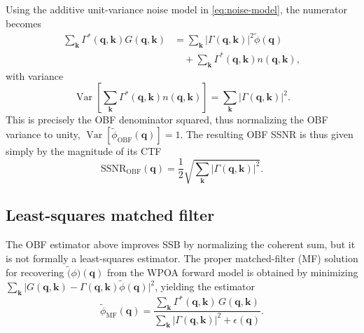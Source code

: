 \documentclass[pdflatex,sn-aps,iicol]{sn-jnl}%
\begin{document}
Using the additive unit-variance noise model in \cref{eq:noise-model}, the numerator becomes
\begin{align}
  \sum_{\boldsymbol{k}}\Gamma^{*}(\boldsymbol{q},\boldsymbol{k})G(\boldsymbol{q},\boldsymbol{k}) &=
  \sum_{\boldsymbol{k}}\lvert \Gamma(\boldsymbol{q},\boldsymbol{k}) \rvert^2 \tilde{\phi}(\boldsymbol{q}) \nonumber\\
  &\quad + \sum_{\boldsymbol{k}}\Gamma^{*}(\boldsymbol{q},\boldsymbol{k})n(\boldsymbol{q},\boldsymbol{k}),
  \label{eq:obf-numerator}
\end{align}
with variance
\begin{equation}
  \operatorname{Var}\!\left[ \sum_{\boldsymbol{k}}\Gamma^{*}(\boldsymbol{q},\boldsymbol{k})n(\boldsymbol{q},\boldsymbol{k}) \right] = \sum_{\boldsymbol{k}}\lvert \Gamma(\boldsymbol{q},\boldsymbol{k}) \rvert^2 .
  \label{eq:obf-var}
\end{equation}
This is precisely the OBF denominator squared, thus normalizing the OBF variance to unity, $\operatorname{Var}[\tilde{\phi}_{\text{OBF}}(\boldsymbol{q})]=1$.
The resulting OBF SSNR is thus given simply by the magnitude of its CTF
\begin{equation}
  \mathrm{SSNR}_{\text{OBF}}(\boldsymbol{q}) = \frac{1}{2} \sqrt{\sum_{\boldsymbol{k}}\lvert \Gamma(\boldsymbol{q},\boldsymbol{k}) \rvert^2}.
  \label{eq:obf-ssnr}
\end{equation}

\subsection*{Least-squares matched filter}
\label{sec:wdd}

The OBF estimator above improves SSB by normalizing the coherent sum, but it is not formally a least-squares estimator.
The proper matched-filter (MF) solution for recovering $\tilde(\phi)(\boldsymbol{q})$ from the WPOA forward model is obtained by minimizing $\sum_{\boldsymbol{k}}\lvert G(\boldsymbol{q},\boldsymbol{k})-\Gamma(\boldsymbol{q},\boldsymbol{k})\tilde{\phi}(\boldsymbol{q}) \rvert^2$, yielding the estimator
\begin{equation}
  \tilde{\phi}_{\text{MF}}(\boldsymbol{q}) = 
  \frac{\sum_{\boldsymbol{k}} \Gamma^{*}(\boldsymbol{q},\boldsymbol{k})\,G(\boldsymbol{q},\boldsymbol{k})}
  {\sum_{\boldsymbol{k}}\lvert \Gamma(\boldsymbol{q},\boldsymbol{k}) \rvert^2 + \epsilon(\boldsymbol{q})}.
  \label{eq:mf-recon}
\end{equation}
\end{document}

